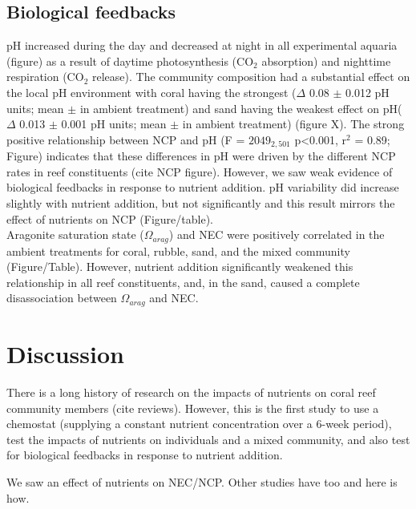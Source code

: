 \documentclass[]{rsos}%
\begin{document}
\subsection{Biological feedbacks}
pH increased during the day and decreased at night in all experimental aquaria (figure) as a result of daytime photosynthesis (CO$_2$ absorption) and nighttime respiration (CO$_2$ release). The community composition had a substantial effect on the local pH environment with coral having the strongest ($\Delta$ 0.08 $\pm$ 0.012 pH units; mean $\pm$ in ambient treatment) and sand having the weakest effect on pH($\Delta$ 0.013 $\pm$ 0.001 pH units; mean $\pm$ in ambient treatment) (figure X). The strong positive relationship between NCP and pH (F = $2049_{2,501}$ p<0.001, r$^2$ = 0.89; Figure) indicates that these differences in pH were driven by the different NCP rates in reef constituents (cite NCP figure). However, we saw weak evidence of biological feedbacks in response to nutrient addition. pH variability did increase slightly with nutrient addition, but not significantly and this result mirrors the effect of nutrients on NCP (Figure/table). \\
\indent Aragonite saturation state ($\Omega_{arag}$) and NEC were positively correlated in the ambient treatments for coral, rubble, sand, and the mixed community (Figure/Table). However, nutrient addition significantly weakened this relationship in all reef constituents, and, in the sand, caused a complete disassociation between $\Omega_{arag}$ and NEC.

\section{Discussion}
There is a long history of research on the impacts of nutrients on coral reef community members (cite reviews). However, this is the first study to use a chemostat (supplying a constant nutrient concentration over a 6-week period), test the impacts of nutrients on individuals and a mixed community, and also test for biological feedbacks in response to nutrient addition.

We saw an effect of nutrients on NEC/NCP.  Other studies have too and here is how.
\end{document}
